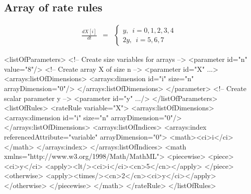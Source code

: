 

\subsection{Array of rate rules}

\begin{eqnarray*}
\frac{dX[i]}{dt} & = & \left\{ \begin{array}{l}
  y,~~i = 0, 1, 2, 3, 4 \\
 2y,~~i = 5, 6, 7 
\end{array}
\right.
\end{eqnarray*}
\begin{example}
<listOfParameters>
 <!-- Create size variables for arrays -->
 <parameter id="n" value="8"/>
 <!-- Create array X of size n -->
 <parameter id="X" ...> 
  <arrays:listOfDimensions>
   <arrays:dimension id="i" size="n" arrayDimension="0"/>
  </arrays:listOfDimensions>
 </parameter>
 <!-- Create scalar parameter y -->
 <parameter id="y" .../>
</listOfParameters>
<listOfRules>
 <rateRule variable="X">
  <arrays:listOfDimensions>
   <arrays:dimension id="i" size="n" arrayDimension="0"/>
  </arrays:listOfDimensions>
  <arrays:listOfIndices>
   <arrays:index referencedAttribute="variable" arrayDimension="0">
    <math><ci>i</ci></math>
   </arrays:index>
  </arrays:listOfIndices>
  <math xmlns="http://www.w3.org/1998/Math/MathML">
    <piecewise>
      <piece>
        <ci>y</ci>
        <apply><lt/><ci>i</ci><cn>5</cn></apply>
      </piece>
      <otherwise>
        <apply><times/><cn>2</cn><ci>y</ci></apply>
      </otherwise>
    </piecewise>
  </math>
 </rateRule>
</listOfRules>
\end{example}

